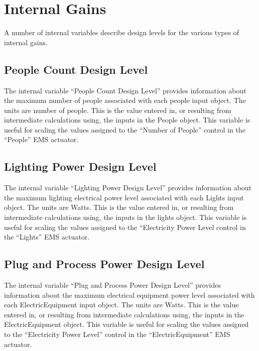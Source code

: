 \section{Internal Gains}\label{internal-gains}

A number of internal variables describe design levels for the various types of internal gains.

\subsection{People Count Design Level}\label{people-count-design-level}

The internal variable ``People Count Design Level'' provides information about the maximum number of people associated with each people input object. The units are number of people. This is the value entered in, or resulting from intermediate calculations using, the inputs in the People object. This variable is useful for scaling the values assigned to the ``Number of People'' control in the ``People'' EMS actuator.

\subsection{Lighting Power Design Level}\label{lighting-power-design-level}

The internal variable ``Lighting Power Design Level'' provides information about the maximum lighting electrical power level associated with each Lights input object. The units are Watts. This is the value entered in, or resulting from intermediate calculations using, the inputs in the lights object. This variable is useful for scaling the values assigned to the ``Electricity Power Level control in the ``Lights'' EMS actuator.

\subsection{Plug and Process Power Design Level}\label{plug-and-process-power-design-level}

The internal variable ``Plug and Process Power Design Level'' provides information about the maximum electrical equipment power level associated with each ElectricEquipment input object. The units are Watts. This is the value entered in, or resulting from intermediate calculations using, the inputs in the ElectricEquipment object. This variable is useful for scaling the values assigned to the ``Electricity Power Level'' control in the ``ElectricEquipment'' EMS actuator.

